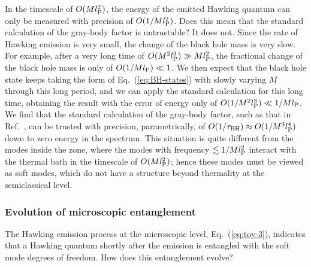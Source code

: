 \documentclass[12pt]{article}
\begin{document}
In the timescale of $O(M l_{\rm P}^2)$, the energy of the 
emitted Hawking quantum can only be measured with precision 
of $O(1/M l_{\rm P}^2)$.  Does this mean that the standard 
calculation of the gray-body factor is untrustable?  It does 
not.  Since the rate of Hawking emission is very small, the change 
of the black hole mass is very slow.  For example, after a very 
long time of $O(M^2 l_{\rm P}^3) \gg M l_{\rm P}^2$, the fractional 
change of the black hole mass is only of $O(1/M l_{\rm P}) \ll 1$. 
We then expect that the black hole state keeps taking the form 
of Eq.~(\ref{eq:BH-states}) with slowly varying $M$ through this 
long period, and we can apply the standard calculation for this 
long time, obtaining the result with the error of energy only 
of $O(1/M^2 l_{\rm P}^3) \ll 1/M l_{\rm P}$.  We find that 
the standard calculation of the gray-body factor, such as 
that in Ref.~\cite{Page:1976df}, can be trusted with precision, 
parametrically, of $O(1/\tau_{\rm BH}) \approx O(1/M^3 l_{\rm P}^4)$ 
down to zero energy in the spectrum.  This situation is quite 
different from the modes inside the zone, where the modes with 
frequency $\lesssim 1/M l_{\rm P}^2$ interact with the thermal 
bath in the timescale of $O(M l_{\rm P}^2)$; hence these modes 
must be viewed as soft modes, which do not have a structure 
beyond thermality at the semiclassical level.

\subsubsection{Evolution of microscopic entanglement}
\label{subsubsec:micro}

The Hawking emission process at the microscopic level, 
Eq.~(\ref{eq:toy-3}), indicates that a Hawking quantum shortly 
after the emission is entangled with the soft mode degrees of 
freedom.  How does this entanglement evolve?
\end{document}

